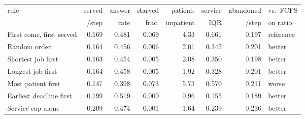 \begin{tabular}{lrrrrrrl}
\toprule
rule & served & answer & starved & patient: & service & abandoned & vs.\ FCFS \\
 & /step & rate & frac. & impatient & IQR & /step & on ratio \\
\midrule
First come, first served & 0.169 & 0.481 & 0.069 & 4.33 & 0.661 & 0.197 & reference \\
Random order & 0.164 & 0.456 & 0.006 & 2.01 & 0.342 & 0.201 & better \\
Shortest job first & 0.163 & 0.454 & 0.005 & 2.08 & 0.350 & 0.198 & better \\
Longest job first & 0.164 & 0.458 & 0.005 & 1.92 & 0.328 & 0.201 & better \\
Most patient first & 0.147 & 0.398 & 0.073 & 5.73 & 0.570 & 0.211 & worse \\
Earliest deadline first & 0.199 & 0.519 & 0.000 & 0.96 & 0.155 & 0.189 & better \\
Service cap alone & 0.209 & 0.474 & 0.001 & 1.64 & 0.239 & 0.236 & better \\
\bottomrule
\end{tabular}
